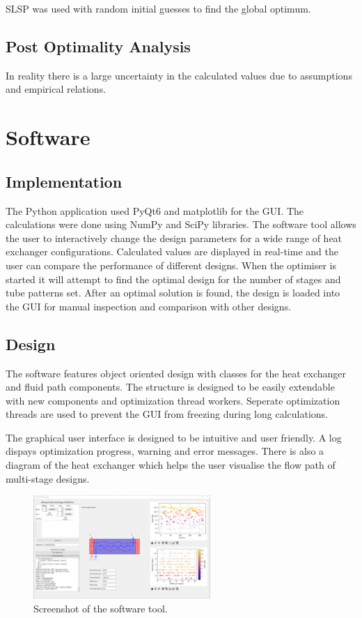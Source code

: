 \documentclass{article}
\begin{document}
SLSP was used with random initial guesses to find the global optimum.


\subsection{Post Optimality Analysis}

In reality there is a large uncertainty in the calculated values due to assumptions and empirical relations.


\section{Software}

\subsection{Implementation}

The Python application used PyQt6 and matplotlib for the GUI. The calculations were done using NumPy and SciPy libraries.
The software tool allows the user to interactively change the design parameters for a wide range of heat exchanger configurations.
Calculated values are displayed in real-time and the user can compare the performance of different designs.
When the optimiser is started it will attempt to find the optimal design for the number of stages and tube patterns set.
After an optimal solution is found, the design is loaded into the GUI for manual inspection and comparison with other designs.

\subsection{Design}
The software features object oriented design with classes for the heat exchanger and fluid path components.
The structure is designed to be easily extendable with new components and optimization thread workers.
Seperate optimization threads are used to prevent the GUI from freezing during long calculations.

The graphical user interface is designed to be intuitive and user friendly. A log dispays optimization progress, warning and error messages. There is also a diagram of the heat exchanger which helps
the user visualise the flow path of multi-stage designs.

\begin{figure}[H]
  \centering
  \includegraphics[width=0.6\textwidth]{software.png}
  \caption{Screenshot of the software tool.}
  \label{fig:software}
\end{figure}
\end{document}
